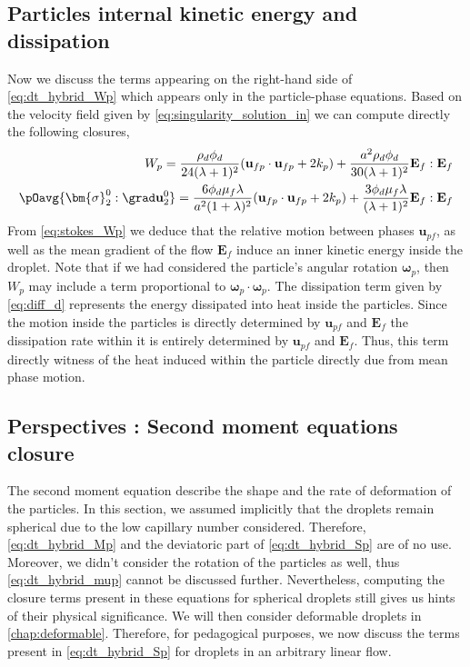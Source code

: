 \subsection{Particles internal kinetic energy and dissipation}
Now we discuss the terms appearing on the right-hand side of \ref{eq:dt_hybrid_Wp} which appears only in the particle-phase equations. 
Based on the velocity field given by \ref{eq:singularity_solution_in} we can compute directly the following closures,
\begin{align}
    \label{eq:stokes_Wp}
    W_p =  \frac{\rho_d \phi_d}{24 (\lambda +1)^2}
    (\textbf{u}_{fp} \cdot \textbf{u}_{fp} + 2 k_p)
    + \frac{a^2 \rho_d \phi_d}{30(\lambda+1)^2}
    \textbf{E}_f:\textbf{E}_f    \\
    \pOavg{\bm{\sigma}_2^0:\grad \textbf{u}_2^0}
    = 
    \frac{6 \phi_d \mu_f \lambda}{a^2(1+\lambda)^2}
    (\textbf{u}_{fp}\cdot \textbf{u}_{fp} + 2k_p)
    + \frac{3 \phi_d \mu_f \lambda}{(\lambda+1)^2}\textbf{E}_f:\textbf{E}_f
    \label{eq:diff_d}
\end{align}
From \ref{eq:stokes_Wp} we deduce that the relative motion between phases $\textbf{u}_{pf}$, as well as the mean gradient of the flow $\textbf{E}_f$ induce an inner kinetic energy inside the droplet. 
Note that if we had considered the particle's angular rotation $\bm\omega_p$, then $W_p$ may include a term proportional to $\bm\omega_p\cdot \bm\omega_p$. 
The dissipation term given by \ref{eq:diff_d} represents the energy dissipated into heat inside the particles. 
Since the motion inside the particles is directly determined by $\textbf{u}_{pf}$ and $\textbf{E}_f$ the dissipation rate within it is entirely determined by $\textbf{u}_{pf}$ and $\textbf{E}_f$. 
Thus, this term directly witness of the heat induced within the particle directly due from mean phase motion. 

\subsection{Perspectives : Second moment equations closure}

The second moment equation describe the shape and the rate of deformation of the particles.
In this section, we assumed implicitly that the droplets remain spherical due to the low capillary number considered. 
Therefore, \ref{eq:dt_hybrid_Mp} and the deviatoric part of \ref{eq:dt_hybrid_Sp} are of no use. 
Moreover, we didn't consider the rotation of the particles as well, thus \ref{eq:dt_hybrid_mup} cannot be discussed further. 
Nevertheless, computing the closure terms present in these equations for spherical droplets still gives us hints of their physical significance.
We will then consider deformable droplets in \ref{chap:deformable}.
Therefore, for pedagogical purposes, we now discuss the terms present in \ref{eq:dt_hybrid_Sp} for droplets in an arbitrary linear flow. 


